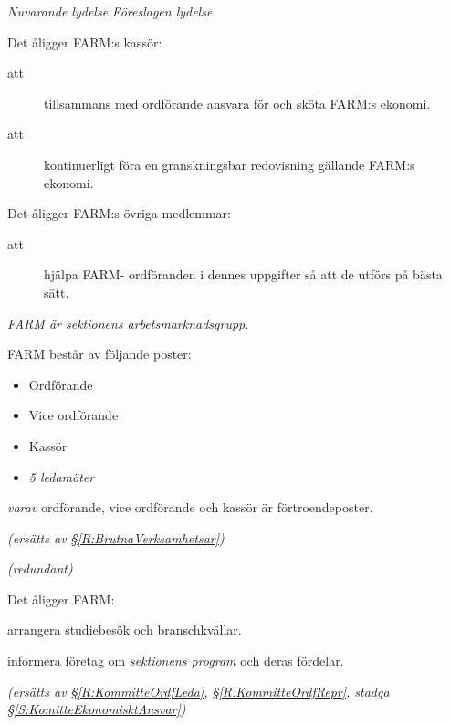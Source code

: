 \documentclass{article}
\newenvironment{lydelse}
    {\begin{paracol}{2}%
        \emph{Nuvarande lydelse}%
        \switchcolumn%
        \emph{Föreslagen lydelse}%
    \end{paracol}%
    \begin{enumerate}[label=\thesubsection.\arabic*]%
    \begin{paracol}{2}%
    }{\end{paracol}\end{enumerate}}
\begin{document}
\begin{lydelse}
    \item Det åligger FARM:s kassör:
	\begin{description}
		\item[att] tillsammans med ordförande ansvara för och sköta FARM:s ekonomi.
		\item[att] kontinuerligt föra en granskningsbar redovisning gällande FARM:s ekonomi.
	\end{description}

    \item Det åligger FARM:s övriga medlemmar:
	\begin{description}
		\item[att] hjälpa FARM- ordföranden i dennes uppgifter så att de utförs på bästa sätt.
	\end{description}
	\setcounter{section}{5}
    \setcounter{subsection}{3}
    \switchcolumn 
    \item \emph{FARM är sektionens arbetsmarknadsgrupp.}

    \item FARM består av följande poster:
    \begin{itemize}
        \item Ordförande
     	\item Vice ordförande
    	\item Kassör
    	\item \emph{5 ledamöter}
    \end{itemize}
    \emph{varav} ordförande, vice ordförande och kassör är förtroendeposter.
    
    \item[] \emph{(ersätts av \S \ref{R:BrutnaVerksamhetsar})} \vspace{1.2em}
    
    \item[] \emph{(redundant)}\vspace{2.4em}
    
    \item Det åligger FARM:
    \begin{aligganden}
        \vspace{-0.3em}
        \item arrangera studiebesök och branschkvällar. \vspace{0.2em}
        \item informera företag om \emph{sektionens program} och deras fördelar.
    \end{aligganden}
    
    \vspace{1.2em}
    \item[] \emph{(ersätts av \S \ref{R:KommitteOrdfLeda}, \S \ref{R:KommitteOrdfRepr}, stadga \S \ref{S:KomitteEkonomisktAnsvar})} 
    

\end{lydelse}
\end{document}
